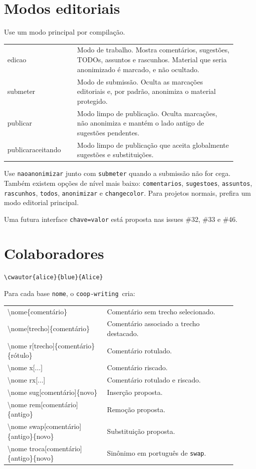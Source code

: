 \documentclass[11pt]{article}
\newcommand{\pkg}{\texttt{coop-writing}}
\newcommand{\opt}[1]{\texttt{#1}}
\begin{document}
\section*{Modos editoriais}

Use um modo principal por compilação.

\begin{longtable}{>{\ttfamily}p{0.28\linewidth}p{0.64\linewidth}}
edicao &
Modo de trabalho. Mostra comentários, sugestões, TODOs, assuntos e rascunhos. Material que seria anonimizado é marcado, e não ocultado.\\
submeter &
Modo de submissão. Oculta as marcações editoriais e, por padrão, anonimiza o material protegido.\\
publicar &
Modo limpo de publicação. Oculta marcações, não anonimiza e mantém o lado antigo de sugestões pendentes.\\
publicaraceitando &
Modo limpo de publicação que aceita globalmente sugestões e substituições.\\
\end{longtable}

Use \opt{naoanonimizar} junto com \opt{submeter} quando a submissão não for cega. Também existem opções de nível mais baixo: \opt{comentarios}, \opt{sugestoes}, \opt{assuntos}, \opt{rascunhos}, \opt{todos}, \opt{anonimizar} e \opt{changecolor}. Para projetos normais, prefira um modo editorial principal.

Uma futura interface \texttt{chave=valor} está proposta nas issues \#32, \#33 e \#46.

\section*{Colaboradores}

\begin{verbatim}
\cwautor{alice}{blue}{Alice}
\end{verbatim}

Para cada base \texttt{nome}, o \pkg\ cria:

\begin{longtable}{>{\ttfamily\raggedright\arraybackslash}p{0.40\linewidth}p{0.52\linewidth}}
\textbackslash nome\{comentário\} & Comentário sem trecho selecionado.\\
\textbackslash nome[trecho]\{comentário\} & Comentário associado a trecho destacado.\\
\textbackslash nome r[trecho]\{comentário\}\{rótulo\} & Comentário rotulado.\\
\textbackslash nome x[...] & Comentário riscado.\\
\textbackslash nome rx[...] & Comentário rotulado e riscado.\\
\textbackslash nome sug[comentário]\{novo\} & Inserção proposta.\\
\textbackslash nome rem[comentário]\{antigo\} & Remoção proposta.\\
\textbackslash nome swap[comentário]\{antigo\}\{novo\} & Substituição proposta.\\
\textbackslash nome troca[comentário]\{antigo\}\{novo\} & Sinônimo em português de \texttt{swap}.\\
\end{longtable}
\end{document}
